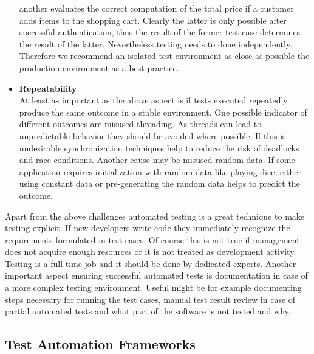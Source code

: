 \documentclass[12pt, notitlepage]{article}
\begin{document}
\begin{itemize}
	another evaluates the correct computation of the total price if a customer adds items to the shopping cart.
	Clearly the latter is only possible after successful authentication, thus the result of the former test case determines the result of the latter.
	Nevertheless testing needs to done independently. Therefore we recommend an isolated test environment as close as possible the production environment
	as a best practice.
	\item \textbf{Repeatability}\\
	At least as important as the above aspect is if tests executed repeatedly produce the same outcome in a stable environment. One possible 
	indicator of different outcomes are misused threading. As threads can lead to unpredictable behavior they should be avoided where possible. 
	If this is undesirable synchronization techniques help to reduce the risk of deadlocks and race conditions. 
	Another cause may be misused random data. If some application requires initialization with random data like playing dice, either using constant data
	or pre-generating the random data helps to predict the outcome. 
\end{itemize}
Apart from the above challenges automated testing is a great technique to make testing explicit. If new developers write code they immediately recognize 
the requirements formulated in test cases. Of course this is not true if management does not acquire enough resources or it is not treated as development activity.
Testing is a full time job and it should be done by dedicated experts.
Another important aspect ensuring successful automated tests is documentation in case of a more complex testing environment. Useful might be for example
documenting steps necessary for running the test cases, manual test result review in case of partial automated tests and what part of the software is not
tested and why. 
\subsection{Test Automation Frameworks}

\newpage


\end{document}
